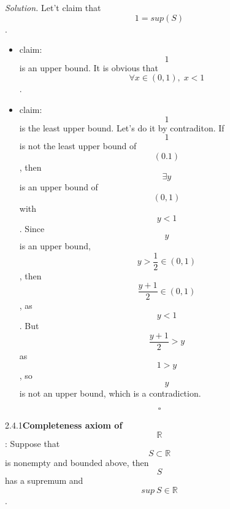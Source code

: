 \documentclass[a4paper]{article}
\def\rr{{\mathbb R}}
\newenvironment{solution}{\emph{Solution.}}{\hfill$$\square$$}
\begin{document}
\begin{solution}
    Let't claim that $$1=sup(S)$$.
    \begin{itemize}
        \item claim: $$1$$ is an upper bound. It is obvious that $$\forall x \in (0,1), \; x<1$$.
        \item claim: $$1$$ is the least upper bound. Let's do it by contraditon.
         If $$1$$ is not the least upper bound of $$(0.1)$$, then $$\exists y$$ is an upper bound of$$(0,1)$$ with $$y<1$$. 
         Since $$y$$ is an upper bound, $$y>\frac{1}{2} \in (0,1)$$, then $$\frac{y+1}{2} \in (0,1)$$, as$$y<1$$. But $$\frac{y+1}{2} > y$$ as $$1>y$$, so $$y$$ is not an upper bound, which is a contradiction.  
    \end{itemize}
\end{solution}
\begin{theorem}{2.4.1}{}\textbf{Completeness axiom of $$\rr$$}:
    Suppose that $$S\subset \mathbb{R}$$ is nonempty and bounded above, then $$S$$ has a supremum and $$sup\:S\in \mathbb{R}$$.
\end{theorem}
\end{document}

